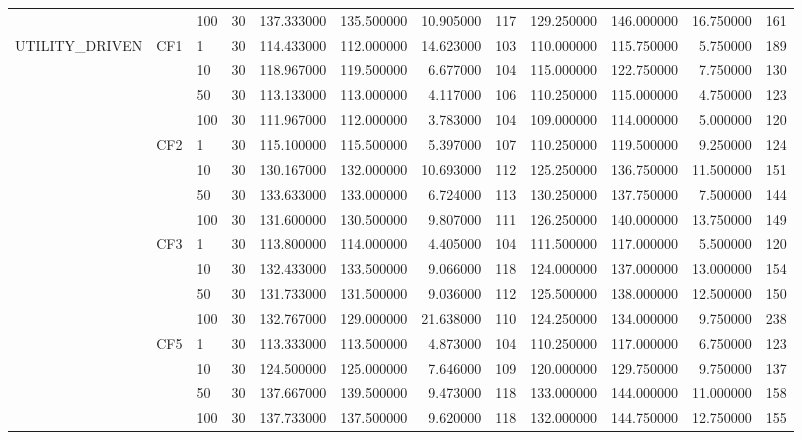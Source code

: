 \begin{tabular}{lllrrrrrrrrr}
 &  & 100 & 30 & 137.333000 & 135.500000 & 10.905000 & 117 & 129.250000 & 146.000000 & 16.750000 & 161 \\
\cline{1-12} \cline{2-12}
\multirow[t]{16}{*}{UTILITY_DRIVEN} & \multirow[t]{4}{*}{CF1} & 1 & 30 & 114.433000 & 112.000000 & 14.623000 & 103 & 110.000000 & 115.750000 & 5.750000 & 189 \\
 &  & 10 & 30 & 118.967000 & 119.500000 & 6.677000 & 104 & 115.000000 & 122.750000 & 7.750000 & 130 \\
 &  & 50 & 30 & 113.133000 & 113.000000 & 4.117000 & 106 & 110.250000 & 115.000000 & 4.750000 & 123 \\
 &  & 100 & 30 & 111.967000 & 112.000000 & 3.783000 & 104 & 109.000000 & 114.000000 & 5.000000 & 120 \\
\cline{2-12}
 & \multirow[t]{4}{*}{CF2} & 1 & 30 & 115.100000 & 115.500000 & 5.397000 & 107 & 110.250000 & 119.500000 & 9.250000 & 124 \\
 &  & 10 & 30 & 130.167000 & 132.000000 & 10.693000 & 112 & 125.250000 & 136.750000 & 11.500000 & 151 \\
 &  & 50 & 30 & 133.633000 & 133.000000 & 6.724000 & 113 & 130.250000 & 137.750000 & 7.500000 & 144 \\
 &  & 100 & 30 & 131.600000 & 130.500000 & 9.807000 & 111 & 126.250000 & 140.000000 & 13.750000 & 149 \\
\cline{2-12}
 & \multirow[t]{4}{*}{CF3} & 1 & 30 & 113.800000 & 114.000000 & 4.405000 & 104 & 111.500000 & 117.000000 & 5.500000 & 120 \\
 &  & 10 & 30 & 132.433000 & 133.500000 & 9.066000 & 118 & 124.000000 & 137.000000 & 13.000000 & 154 \\
 &  & 50 & 30 & 131.733000 & 131.500000 & 9.036000 & 112 & 125.500000 & 138.000000 & 12.500000 & 150 \\
 &  & 100 & 30 & 132.767000 & 129.000000 & 21.638000 & 110 & 124.250000 & 134.000000 & 9.750000 & 238 \\
\cline{2-12}
 & \multirow[t]{4}{*}{CF5} & 1 & 30 & 113.333000 & 113.500000 & 4.873000 & 104 & 110.250000 & 117.000000 & 6.750000 & 123 \\
 &  & 10 & 30 & 124.500000 & 125.000000 & 7.646000 & 109 & 120.000000 & 129.750000 & 9.750000 & 137 \\
 &  & 50 & 30 & 137.667000 & 139.500000 & 9.473000 & 118 & 133.000000 & 144.000000 & 11.000000 & 158 \\
 &  & 100 & 30 & 137.733000 & 137.500000 & 9.620000 & 118 & 132.000000 & 144.750000 & 12.750000 & 155 \\

\end{tabular}
